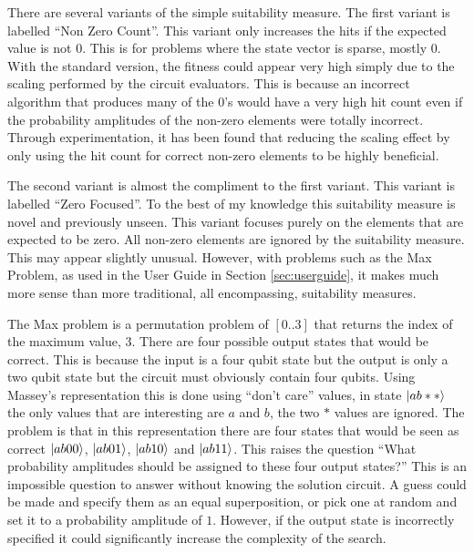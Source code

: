 There are several variants of the simple suitability measure.
The first variant is labelled ``Non Zero Count''.
This variant only increases the hits if the expected value is not $0$.
This is for problems where the state vector is sparse, mostly $0$.
With the standard version, the fitness could appear very high simply due to the scaling performed by the circuit evaluators.
This is because an incorrect algorithm that produces many of the $0$'s would have a very high hit count even if the probability amplitudes of the non-zero elements were totally incorrect.
Through experimentation, it has been found that reducing the scaling effect by only using the hit count for correct non-zero elements to be highly beneficial.

The second variant is almost the compliment to the first variant.
This variant is labelled ``Zero Focused''.
To the best of my knowledge this suitability measure is novel and previously unseen.
This variant focuses purely on the elements that are expected to be zero.
All non-zero elements are ignored by the suitability measure.
This may appear slightly unusual.
However, with problems such as the Max Problem, as used in the User Guide in Section \ref{sec:userguide}, it makes much more sense than more traditional, all encompassing, suitability measures.

The Max problem is a permutation problem of $[0..3]$ that returns the index of the maximum value, $3$.
There are four possible output states that would be correct.
This is because the input is a four qubit state but the output is only a two qubit state but the circuit must obviously contain four qubits.
Using Massey's\cite{masseythesis} representation this is done using ``don't care'' values, in state $\left\vert{ab**}\right\rangle$ the only values that are interesting are $a$ and $b$, the two $*$ values are ignored.
The problem is that in this representation there are four states that would be seen as correct $\left\vert{ab00}\right\rangle$, $\left\vert{ab01}\right\rangle$, $\left\vert{ab10}\right\rangle$ and $\left\vert{ab11}\right\rangle$.
This raises the question ``What probability amplitudes should be assigned to these four output states?''
This is an impossible question to answer without knowing the solution circuit.
A guess could be made and specify them as an equal superposition, or pick one at random and set it to a probability amplitude of $1$.
However, if the output state is incorrectly specified it could significantly increase the complexity of the search.

